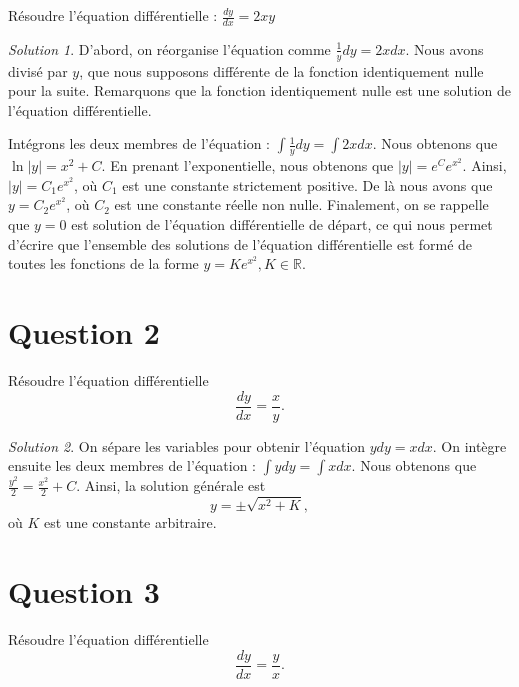 \documentclass[
  12pt,
  letterpaper,
]{book}
\theoremstyle{remark}
\newtheorem*{solution}{Solution}
\begin{document}
Résoudre l'équation différentielle : \(\frac{dy}{dx} = 2xy\)

\begin{solution}
D'abord, on réorganise l'équation comme \(\frac{1}{y}dy = 2x dx\). Nous
avons divisé par \(y\), que nous supposons différente de la fonction
identiquement nulle pour la suite. Remarquons que la fonction
identiquement nulle est une solution de l'équation différentielle.

Intégrons les deux membres de l'équation :
\(\int \frac{1}{y}dy = \int 2x dx\). Nous obtenons
que\(\ln|y| = x^2 + C\). En prenant l'exponentielle, nous obtenons que
\(|y|=e^{C}e^{x^2}\). Ainsi, \(|y|=C_1e^{x^2}\), où \(C_1\) est une
constante strictement positive. De là nous avons que \(y=C_2e^{x^2}\),
où \(C_2\) est une constante réelle non nulle. Finalement, on se
rappelle que \(y=0\) est solution de l'équation différentielle de
départ, ce qui nous permet d'écrire que l'ensemble des solutions de
l'équation différentielle est formé de toutes les fonctions de la forme
\(y=Ke^{x^2}, K\in\mathbb{R}\).
\end{solution}

\section{Question 2}\label{question-2}

Résoudre l'équation différentielle \[\frac{dy}{dx} = \frac{x}{y}.\]

\begin{solution}
On sépare les variables pour obtenir l'équation \(y dy = x dx\). On
intègre ensuite les deux membres de l'équation :
\(\int y dy = \int x dx\). Nous obtenons que
\(\frac{y^2}{2} = \frac{x^2}{2} + C\). Ainsi, la solution générale est
\[y = \pm\sqrt{x^2 + K},\] où \(K\) est une constante arbitraire.
\end{solution}

\section{Question 3}\label{question-3}

Résoudre l'équation différentielle \[\frac{dy}{dx} = \frac{y}{x}.\]
\end{document}
